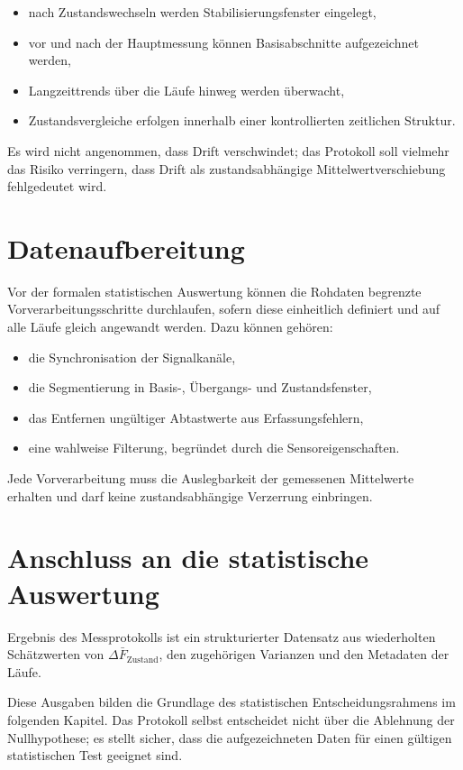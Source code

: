 \documentclass[12pt,a4paper]{report}
\begin{document}
\begin{itemize}
\item nach Zustandswechseln werden Stabilisierungsfenster eingelegt,
\item vor und nach der Hauptmessung können Basisabschnitte aufgezeichnet
      werden,
\item Langzeittrends über die Läufe hinweg werden überwacht,
\item Zustandsvergleiche erfolgen innerhalb einer kontrollierten
      zeitlichen Struktur.
\end{itemize}

Es wird nicht angenommen, dass Drift verschwindet; das Protokoll soll
vielmehr das Risiko verringern, dass Drift als zustandsabhängige
Mittelwertverschiebung fehlgedeutet wird.

\section{Datenaufbereitung}

Vor der formalen statistischen Auswertung können die Rohdaten begrenzte
Vorverarbeitungsschritte durchlaufen, sofern diese einheitlich definiert
und auf alle Läufe gleich angewandt werden. Dazu können gehören:

\begin{itemize}
\item die Synchronisation der Signalkanäle,
\item die Segmentierung in Basis-, Übergangs- und Zustandsfenster,
\item das Entfernen ungültiger Abtastwerte aus Erfassungsfehlern,
\item eine wahlweise Filterung, begründet durch die
      Sensoreigenschaften.
\end{itemize}

Jede Vorverarbeitung muss die Auslegbarkeit der gemessenen Mittelwerte
erhalten und darf keine zustandsabhängige Verzerrung einbringen.

\section{Anschluss an die statistische Auswertung}

Ergebnis des Messprotokolls ist ein strukturierter Datensatz aus
wiederholten Schätzwerten von $\Delta \bar{F}_{\text{Zustand}}$, den
zugehörigen Varianzen und den Metadaten der Läufe.

Diese Ausgaben bilden die Grundlage des statistischen
Entscheidungsrahmens im folgenden Kapitel. Das Protokoll selbst
entscheidet nicht über die Ablehnung der Nullhypothese; es stellt
sicher, dass die aufgezeichneten Daten für einen gültigen statistischen
Test geeignet sind.
\end{document}

